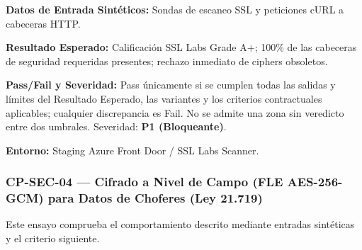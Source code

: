 \par\noindent\textbf{Datos de Entrada Sintéticos:} Sondas de escaneo SSL y peticiones cURL a cabeceras HTTP.\par
\par\noindent\textbf{Resultado Esperado:} Calificación SSL Labs Grade A+; 100\% de las cabeceras de seguridad requeridas presentes; rechazo inmediato de ciphers obsoletos.\par
\par\noindent\textbf{Pass/Fail y Severidad:} Pass únicamente si se cumplen todas las salidas y límites del Resultado Esperado, las variantes y los criterios contractuales aplicables; cualquier discrepancia es Fail. No se admite una zona sin veredicto entre dos umbrales. Severidad: \textbf{P1 (Bloqueante)}.\par
\par\noindent\textbf{Entorno:} Staging Azure Front Door / SSL Labs Scanner.\par






\subsubsection*{CP-SEC-04 — Cifrado a Nivel de Campo (FLE AES-256-GCM) para Datos de Choferes (Ley 21.719)}\label{sec:9-cp-sec-04}
Este ensayo comprueba el comportamiento descrito mediante entradas sintéticas y el criterio siguiente.

